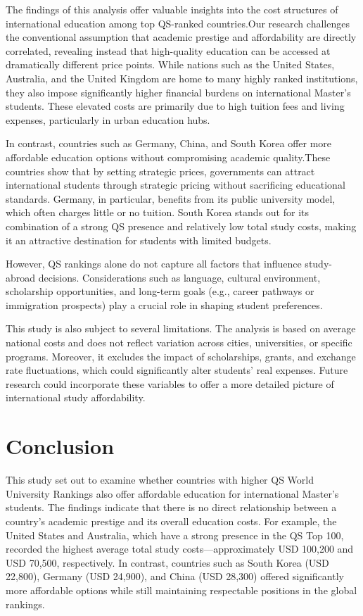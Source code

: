 \documentclass[
  letterpaper,
  DIV=11,
  numbers=noendperiod]{scrartcl}
\begin{document}
The findings of this analysis offer valuable insights into the cost
structures of international education among top QS-ranked countries.Our
research challenges the conventional assumption that academic prestige
and affordability are directly correlated, revealing instead that
high-quality education can be accessed at dramatically different price
points. While nations such as the United States, Australia, and the
United Kingdom are home to many highly ranked institutions, they also
impose significantly higher financial burdens on international Master's
students. These elevated costs are primarily due to high tuition fees
and living expenses, particularly in urban education hubs.

In contrast, countries such as Germany, China, and South Korea offer
more affordable education options without compromising academic
quality.These countries show that by setting strategic prices,
governments can attract international students through strategic pricing
without sacrificing educational standards. Germany, in particular,
benefits from its public university model, which often charges little or
no tuition. South Korea stands out for its combination of a strong QS
presence and relatively low total study costs, making it an attractive
destination for students with limited budgets.

However, QS rankings alone do not capture all factors that influence
study-abroad decisions. Considerations such as language, cultural
environment, scholarship opportunities, and long-term goals (e.g.,
career pathways or immigration prospects) play a crucial role in shaping
student preferences.

This study is also subject to several limitations. The analysis is based
on average national costs and does not reflect variation across cities,
universities, or specific programs. Moreover, it excludes the impact of
scholarships, grants, and exchange rate fluctuations, which could
significantly alter students' real expenses. Future research could
incorporate these variables to offer a more detailed picture of
international study affordability.

\section{Conclusion}\label{conclusion}

This study set out to examine whether countries with higher QS World
University Rankings also offer affordable education for international
Master's students. The findings indicate that there is no direct
relationship between a country's academic prestige and its overall
education costs. For example, the United States and Australia, which
have a strong presence in the QS Top 100, recorded the highest average
total study costs---approximately USD 100,200 and USD 70,500,
respectively. In contrast, countries such as South Korea (USD 22,800),
Germany (USD 24,900), and China (USD 28,300) offered significantly more
affordable options while still maintaining respectable positions in the
global rankings.
\end{document}
